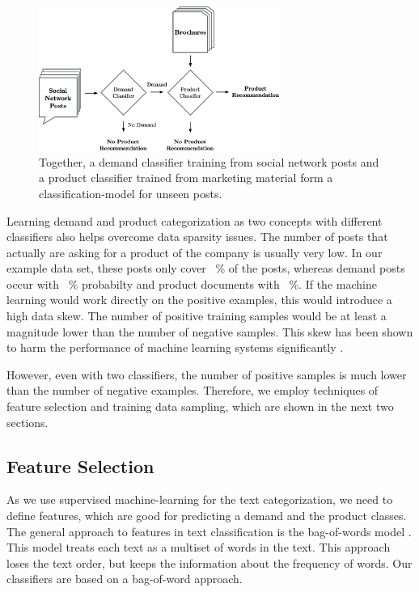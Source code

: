 \begin{figure}
	\label{fig:workflow}
	\begin{center}
		\includegraphics[width=0.7\textwidth]{figures/nto_workflow.eps}
	\end{center}
	\caption{Together, a demand classifier training from social network posts and a product classifier trained from marketing material form a classification-model for unseen posts.}
\end{figure}

Learning demand and product categorization as two concepts with different classifiers also helps overcome data sparsity issues.
The number of posts that actually are asking for a product of the company is usually very low.
In our example data set, these posts only cover ~\% of the posts, whereas demand posts occur with ~\% probabilty and product documents with ~\%.
If the machine learning would work directly on the positive examples, this would introduce a high data skew.
The number of positive training samples would be at least a magnitude lower than the number of negative samples.
This skew has been shown to harm the performance of machine learning systems significantly \cite{monard2002learning,guo2008class}.

However, even with two classifiers, the number of positive samples is much lower than the number of negative examples.
Therefore, we employ techniques of feature selection and training data sampling, which are shown in the next two sections.

\subsection{Feature Selection}
As we use supervised machine-learning for the text categorization, we need to define features, which are good for predicting a demand and the product classes.
The general approach to features in text classification is the bag-of-words model \cite{yang1997comparative,zhang2010understanding}.
This model treats each text as a multiset of words in the text.
This approach loses the text order, but keeps the information about the frequency of words.
Our classifiers are based on a bag-of-word approach.



